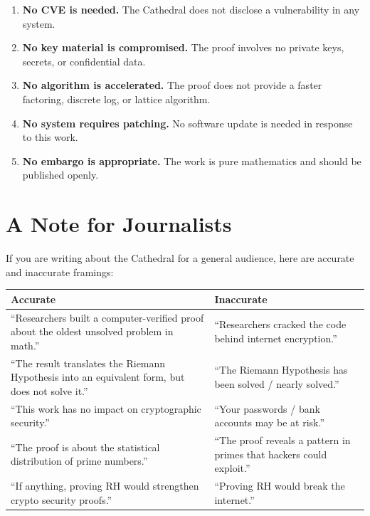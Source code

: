 \documentclass[11pt,a4paper]{article}
\begin{document}
\begin{enumerate}
  \item \textbf{No CVE is needed.} The Cathedral does not disclose
    a vulnerability in any system.
  \item \textbf{No key material is compromised.} The proof involves
    no private keys, secrets, or confidential data.
  \item \textbf{No algorithm is accelerated.} The proof does not
    provide a faster factoring, discrete log, or lattice algorithm.
  \item \textbf{No system requires patching.} No software update
    is needed in response to this work.
  \item \textbf{No embargo is appropriate.} The work is pure
    mathematics and should be published openly.
\end{enumerate}

\section{A Note for Journalists}
\label{sec:journalists}

If you are writing about the Cathedral for a general audience,
here are accurate and inaccurate framings:

\begin{center}
\begin{tabular}{@{}p{}p{}@{}}
\toprule
\textbf{\color{green!50!black}Accurate} &
\textbf{\color{red!70!black}Inaccurate} \\
\midrule
``Researchers built a computer-verified proof about the oldest
unsolved problem in math.'' &
``Researchers cracked the code behind internet encryption.'' \\[0.5em]
``The result translates the Riemann Hypothesis into an equivalent
form, but does not solve it.'' &
``The Riemann Hypothesis has been solved / nearly solved.'' \\[0.5em]
``This work has no impact on cryptographic security.'' &
``Your passwords / bank accounts may be at risk.'' \\[0.5em]
``The proof is about the statistical distribution of prime numbers.'' &
``The proof reveals a pattern in primes that hackers could exploit.'' \\[0.5em]
``If anything, proving RH would strengthen crypto security proofs.'' &
``Proving RH would break the internet.'' \\
\bottomrule
\end{tabular}
\end{center}
\end{document}
